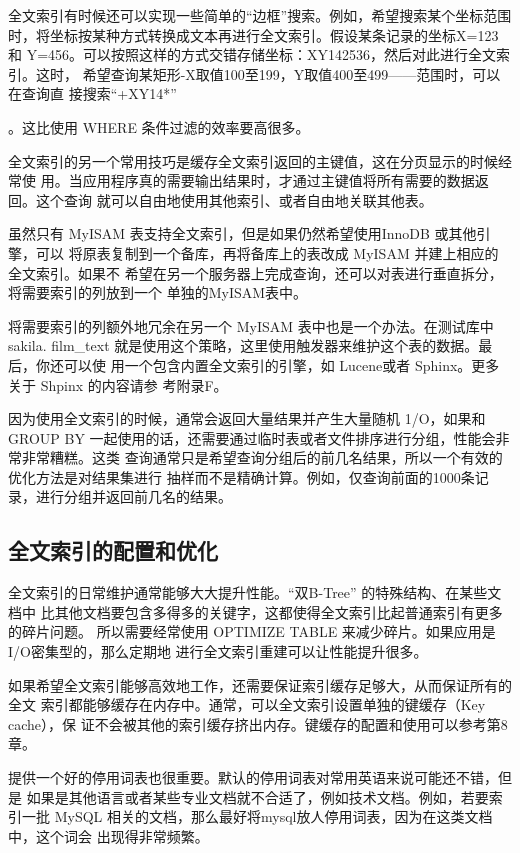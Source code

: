全文索引有时候还可以实现一些简单的“边框”搜索。例如，希望搜索某个坐标范围
时，将坐标按某种方式转换成文本再进行全文索引。假设某条记录的坐标X=123和
Y=456。可以按照这样的方式交错存储坐标：XY142536，然后对此进行全文索引。这时，
希望查询某矩形-X取值100至199，Y取值400至499——范围时，可以在查询直
接搜索“+XY14*”

。这比使用 WHERE 条件过滤的效率要高很多。

全文索引的另一个常用技巧是缓存全文索引返回的主键值，这在分页显示的时候经常使
用。当应用程序真的需要输出结果时，才通过主键值将所有需要的数据返回。这个查询
就可以自由地使用其他索引、或者自由地关联其他表。

虽然只有 MyISAM 表支持全文索引，但是如果仍然希望使用InnoDB 或其他引擎，可以
将原表复制到一个备库，再将备库上的表改成 MyISAM 并建上相应的全文索引。如果不
希望在另一个服务器上完成查询，还可以对表进行垂直拆分，将需要索引的列放到一个
单独的MyISAM表中。

将需要索引的列额外地冗余在另一个 MyISAM 表中也是一个办法。在测试库中 sakila.
film\_text 就是使用这个策略，这里使用触发器来维护这个表的数据。最后，你还可以使
用一个包含内置全文索引的引擎，如 Lucene或者 Sphinx。更多关于 Shpinx 的内容请参
考附录F。

因为使用全文索引的时候，通常会返回大量结果并产生大量随机 1/O，如果和 GROUP BY
一起使用的话，还需要通过临时表或者文件排序进行分组，性能会非常非常糟糕。这类
查询通常只是希望查询分组后的前几名结果，所以一个有效的优化方法是对结果集进行
抽样而不是精确计算。例如，仅查询前面的1000条记录，进行分组并返回前几名的结果。
\subsection{全文索引的配置和优化}
全文索引的日常维护通常能够大大提升性能。“双B-Tree” 的特殊结构、在某些文档中
比其他文档要包含多得多的关键字，这都使得全文索引比起普通索引有更多的碎片问题。
所以需要经常使用 OPTIMIZE TABLE 来减少碎片。如果应用是I/O密集型的，那么定期地
进行全文索引重建可以让性能提升很多。

如果希望全文索引能够高效地工作，还需要保证索引缓存足够大，从而保证所有的全文
索引都能够缓存在内存中。通常，可以全文索引设置单独的键缓存（Key cache），保
证不会被其他的索引缓存挤出内存。键缓存的配置和使用可以参考第8章。

提供一个好的停用词表也很重要。默认的停用词表对常用英语来说可能还不错，但是
如果是其他语言或者某些专业文档就不合适了，例如技术文档。例如，若要索引一批
MySQL 相关的文档，那么最好将mysql放人停用词表，因为在这类文档中，这个词会
出现得非常频繁。

